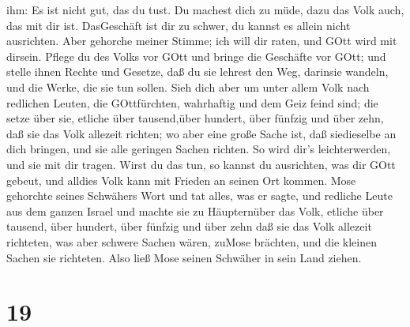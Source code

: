 ihm: Es ist nicht gut, das du tust.  Du machest dich zu
müde, dazu das Volk auch, das mit dir ist. DasGeschäft ist dir zu
schwer, du kannst es allein nicht ausrichten.  Aber
gehorche meiner Stimme; ich will dir raten, und GOtt wird mit dirsein.
Pflege du des Volks vor GOtt und bringe die Geschäfte vor GOtt;
 und stelle ihnen Rechte und Gesetze, daß du sie lehrest
den Weg, darinsie wandeln, und die Werke, die sie tun sollen.
 Sieh dich aber um unter allem Volk nach redlichen Leuten,
die GOttfürchten, wahrhaftig und dem Geiz feind sind; die setze über
sie, etliche über tausend,über hundert, über fünfzig und über zehn,
 daß sie das Volk allezeit richten; wo aber eine große
Sache ist, daß siedieselbe an dich bringen, und sie alle geringen Sachen
richten. So wird dir's leichterwerden, und sie mit dir tragen.
 Wirst du das tun, so kannst du ausrichten, was dir GOtt
gebeut, und alldies Volk kann mit Frieden an seinen Ort kommen.
 Mose gehorchte seines Schwähers Wort und tat alles, was er
sagte,  und redliche Leute aus dem ganzen Israel und machte
sie zu Häupternüber das Volk, etliche über tausend, über hundert, über
fünfzig und über zehn  daß sie das Volk allezeit richteten,
was aber schwere Sachen wären, zuMose brächten, und die kleinen Sachen
sie richteten.  Also ließ Mose seinen Schwäher in sein Land
ziehen.

\hypertarget{section-18}{%
\section{19}\label{section-18}}

